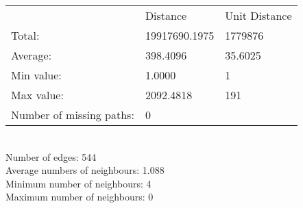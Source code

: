 \begin{tabular}{lll}
 & Distance & Unit Distance\\
Total: & 19917690.1975 & 1779876\\
Average: & 398.4096 & 35.6025\\
Min value: & 1.0000 & 1\\
Max value: & 2092.4818 & 191\\
\hline
Number of missing paths: & 0 &\\
\end{tabular}\\
Number of edges: 544\\
Average numbers of neighbours: 1.088\\
Minimum number of neighbours: 4\\
Maximum number of neighbours: 0\\
